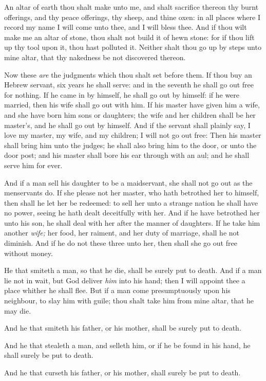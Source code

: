 \documentclass[11pt,letterpaper,oneside]{memoir}
\begin{document}
An altar of earth thou shalt make unto me, and shalt sacrifice thereon
thy burnt offerings, and thy peace offerings, thy sheep, and thine oxen:
in all places where I record my name I will come unto thee, and I will
bless thee. And if thou wilt make me an altar of stone, thou shalt not
build it of hewn stone: for if thou lift up thy tool upon it, thou hast
polluted it. Neither shalt thou go up by steps unto mine altar, that thy
nakedness be not discovered thereon.

Now these \emph{are} the judgments which thou shalt set before them. If
thou buy an Hebrew servant, six years he shall serve: and in the seventh
he shall go out free for nothing. If he came in by himself, he shall go
out by himself: if he were married, then his wife shall go out with him.
If his master have given him a wife, and she have born him sons or
daughters; the wife and her children shall be her master's, and he shall
go out by himself. And if the servant shall plainly say, I love my
master, my wife, and my children; I will not go out free: Then his
master shall bring him unto the judges; he shall also bring him to the
door, or unto the door post; and his master shall bore his ear through
with an aul; and he shall serve him for ever.

And if a man sell his daughter to be a maidservant, she shall not go out
as the menservants do. If she please not her master, who hath betrothed
her to himself, then shall he let her be redeemed: to sell her unto a
strange nation he shall have no power, seeing he hath dealt deceitfully
with her. And if he have betrothed her unto his son, he shall deal with
her after the manner of daughters. If he take him another \emph{wife;}
her food, her raiment, and her duty of marriage, shall he not diminish.
And if he do not these three unto her, then shall she go out free
without money.

He that smiteth a man, so that he die, shall be surely put to death. And
if a man lie not in wait, but God deliver \emph{him} into his hand; then
I will appoint thee a place whither he shall flee. But if a man come
presumptuously upon his neighbour, to slay him with guile; thou shalt
take him from mine altar, that he may die.

And he that smiteth his father, or his mother, shall be surely put to
death.

And he that stealeth a man, and selleth him, or if he be found in his
hand, he shall surely be put to death.

And he that curseth his father, or his mother, shall surely be put to
death.
\end{document}
